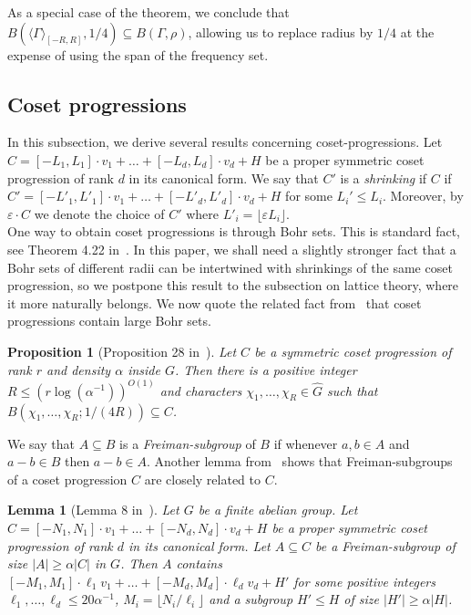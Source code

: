 \documentclass[a4paper,11pt]{article}
\numberwithin{theorem}{section}
\newtheorem{lemma}[theorem]{Lemma}
\newtheorem{proposition}[theorem]{Proposition}
\theoremstyle{definition}
\begin{document}
As a special case of the theorem, we conclude that $B(\langle \Gamma \rangle_{[-R, R]} , 1/4) \subseteq B(\Gamma, \rho)$, allowing us to replace radius by $1/4$ at the expense of using the span of the frequency set.

\subsection{Coset progressions}

In this subsection, we derive several results concerning coset-progressions. Let $C = [-L_1, L_1] \cdot v_1 + \dots + [-L_d, L_d] \cdot v_d + H$ be a proper symmetric coset progression of rank $d$ in its canonical form. We say that $C'$ is a \textit{shrinking} if $C$ if $C' = [-L'_1, L'_1] \cdot v_1 + \dots + [-L'_d, L'_d] \cdot v_d + H$ for some $L_i' \leq L_i$. Moreover, by $\varepsilon \cdot C$ we denote the choice of $C'$ where $L'_i = \lfloor \varepsilon L_i \rfloor$.\\

One way to obtain coset progressions is through Bohr sets. This is standard fact, see Theorem 4.22 in~\cite{TaoVuBook}. In this paper, we shall need a slightly stronger fact that a Bohr sets of different radii can be intertwined with shrinkings of the same coset progression, so we postpone this result to the subsection on lattice theory, where it more naturally belongs. We now quote the related fact from~\cite{generalBilBog} that coset progressions contain large Bohr sets.

\begin{proposition}[Proposition 28 in~\cite{generalBilBog}]\label{cosettobohrset}Let $C$ be a symmetric coset progression of rank $r$ and density $\alpha$ inside $G$. Then there is a positive integer $R \leq (r \log (\alpha^{-1}))^{O(1)}$ and characters $\chi_1, \dots, \chi_R \in \hat{G}$ such that $B(\chi_1, \dots, \chi_R; 1/(4R)) \subseteq C$.\end{proposition}

We say that $A \subseteq B$ is a \emph{Freiman-subgroup} of $B$ if whenever $a, b \in A$ and $a - b \in B$ then $a - b \in A$. Another lemma from~\cite{generalBilBog} shows that Freiman-subgroups of a coset progression $C$ are closely related to $C$.

\begin{lemma}[Lemma 8 in~\cite{generalBilBog}]\label{progsbgp}Let $G$ be a finite abelian group. Let $C = [-N_1, N_1] \cdot v_1 + \dots + [-N_d, N_d] \cdot v_d + H$ be a proper symmetric coset progression of rank $d$ in its canonical form. Let $A \subseteq C$ be a Freiman-subgroup of size $|A| \geq \alpha |C|$ in $G$. Then $A$ contains $[-M_1, M_1] \cdot \ell_1 v_1 + \dots + [-M_d, M_d] \cdot \ell_d v_d + H'$ for some positive integers $\ell_1, \dots, \ell_d \leq 20\alpha^{-1}$, $M_i = \lfloor N_i/\ell_i\rfloor$ and a subgroup $H' \leq H$ of size $|H'| \geq \alpha |H|$.\end{lemma}
\end{document}
